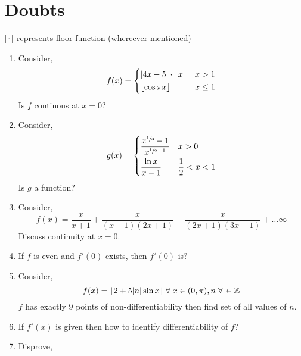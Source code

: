\documentclass{article}
\title{}
\author{}
\date{}
\begin{document}
\maketitle

\section{Doubts}
$\lfloor \cdot \rfloor$ represents floor function (whereever mentioned)
\begin{enumerate}
      \item Consider, $$f(x)=\begin{dcases}
                        |4x-5| \cdot \lfloor x \rfloor & x>1     \\
                        \lfloor \cos \pi x \rfloor     & x \le 1
                  \end{dcases}$$
            Is $f$ continous at $x=0$?
      \item Consider, $$g(x)=\begin{dcases}
                        \dfrac{x^{\sfrac{1}{3}}-1}{x^{\sfrac{1}{2}-1}} & x>0             \\
                        \dfrac{\ln x}{x-1}                             & \frac{1}{2}<x<1
                  \end{dcases}$$
            Is $g$ a function?
      \item Consider, $$f(x)=\frac{x}{x+1}+\frac{x}{(x+1)(2x+1)}+\frac{x}{(2x+1)(3x+1)}+\ldots \infty$$
            Discuss continuity at $x=0$.
      \item If $f$ is even and $f'(0)$ exists, then $f'(0)$ is?
      \item Consider, $$f(x)=\lfloor 2+5|n| \sin x \rfloor \hspace{1mm} \forall \hspace{1mm} x \in (0,\pi), n \hspace{1mm} \forall \hspace{0.5mm}\in \mathbb{Z}$$
            $f$ has exactly $9$ points of non-differentiability then find set of all values of $n$.
      \item If $f'(x)$ is given then how to identify differentiability of $f$?
      \item Disprove,


\end{enumerate}
\end{document}
